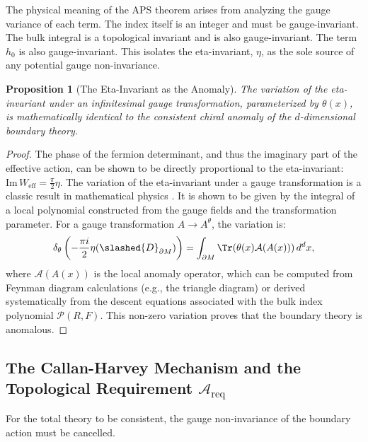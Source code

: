 \documentclass[11pt, letterpaper]{report}
\theoremstyle{plain} %
\newtheorem{proposition}[theorem]{Proposition}
\theoremstyle{definition} %
\theoremstyle{remark} %
\newcommand{\BulkM}{M}
\newcommand{\BoundaryM}{\partial\BulkM}
\newcommand{\DiracOpBoundary}{\slashed{D}_{\BoundaryM}}
\newcommand{\EtaInv}{\eta}
\newcommand{\AnomPoly}{\mathcal{A}}
\begin{document}
The physical meaning of the APS theorem arises from analyzing the gauge variance of each term. The index itself is an integer and must be gauge-invariant. The bulk integral is a topological invariant and is also gauge-invariant. The term $h_0$ is also gauge-invariant. This isolates the eta-invariant, $\EtaInv$, as the sole source of any potential gauge non-invariance.

\begin{proposition}[The Eta-Invariant as the Anomaly]
\label{prop:eta_invariant_anomaly_full_detail}
The variation of the eta-invariant under an infinitesimal gauge transformation, parameterized by $\theta(x)$, is mathematically identical to the consistent chiral anomaly of the $d$-dimensional boundary theory.
\end{proposition}
\begin{proof}
The phase of the fermion determinant, and thus the imaginary part of the effective action, can be shown to be directly proportional to the eta-invariant: $\text{Im}\,W_{\text{eff}} = \frac{\pi}{2}\EtaInv$. The variation of the eta-invariant under a gauge transformation is a classic result in mathematical physics \cite{AlvarezGaume1985Anomalies,Nakahara2003}. It is shown to be given by the integral of a local polynomial constructed from the gauge fields and the transformation parameter. For a gauge transformation $A \to A^\theta$, the variation is:
\begin{equation}
    \delta_\theta \left( -\frac{\pi i}{2} \EtaInv(\DiracOpBoundary) \right) = \int_{\BoundaryM} \Tr(\theta(x) \AnomPoly(A(x))) \, d^dx,
\end{equation}
where $\AnomPoly(A(x))$ is the local anomaly operator, which can be computed from Feynman diagram calculations (e.g., the triangle diagram) or derived systematically from the descent equations associated with the bulk index polynomial $\mathcal{P}(R,F)$. This non-zero variation proves that the boundary theory is anomalous.
\end{proof}

\subsection{The Callan-Harvey Mechanism and the Topological Requirement \texorpdfstring{$\mathcal{A}_{\text{req}}$}{A_req}}
\label{subsec:callan_harvey_formal}

For the total theory to be consistent, the gauge non-invariance of the boundary action must be cancelled.
\end{document}
